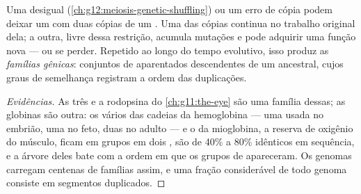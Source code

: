 \begin{proposition}\label{prop:g12:diversification-of-life:duplication}
Uma  desigual (\cref{ch:g12:meiosis-genetic-shuffling}) ou um
erro de cópia podem deixar um  com duas cópias de um .
Uma das cópias continua no trabalho original dela; a outra, livre dessa
restrição, acumula mutações e pode adquirir uma função nova --- ou se
perder. Repetido ao longo do tempo evolutivo, isso produz as
\emph{famílias gênicas}: conjuntos de 
aparentados descendentes de um ancestral, cujos graus de semelhança
registram a ordem das duplicações.
\end{proposition}
\begin{proof}[Evidências]
As três  e a rodopsina do \cref{ch:g11:the-eye} são uma família
dessas; as globinas são outra: os vários  das cadeias da
hemoglobina --- uma usada no embrião, uma no feto, duas no adulto --- e
o  da mioglobina, a reserva de oxigênio do músculo, ficam em grupos
em dois , são de 40\% a 80\% idênticos em sequência, e a
árvore deles bate com a ordem em que os grupos de 
apareceram. Os genomas carregam centenas de famílias assim, e uma
fração considerável de todo genoma consiste em segmentos duplicados.
\end{proof}

